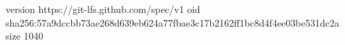 version https://git-lfs.github.com/spec/v1
oid sha256:57a9dccbb73ae268d639eb624a77fbae3c17b2162ff1bc8d4f4ee03be531dc2a
size 1040
